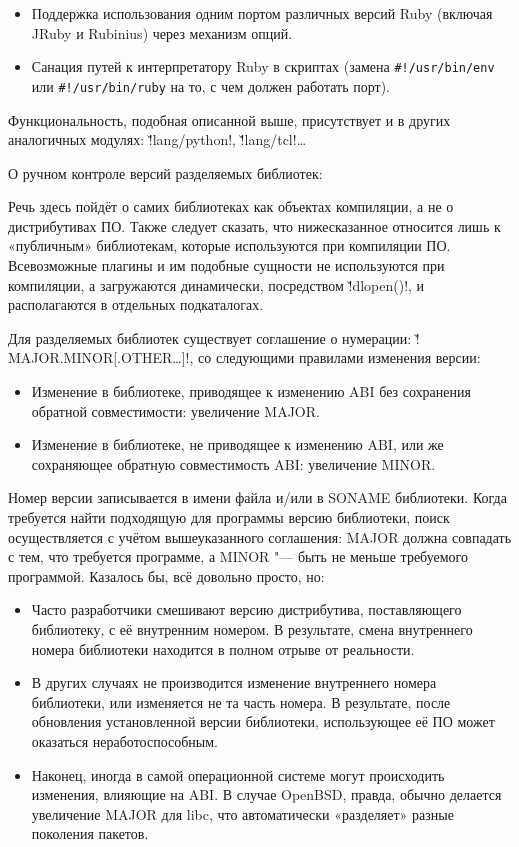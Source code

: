 \documentclass[10pt, a5paper]{article}
\begin{document}
\begin{itemize}
  \item Поддержка использования одним портом различных версий Ruby (включая JRuby и Rubinius) через механизм опций.
  \item Санация путей к интерпретатору Ruby в скриптах (замена \texttt{\#!/usr/bin/env} или \texttt{\#!/usr/bin/ruby} на то, с чем должен работать порт).
\end{itemize}

Функциональность, подобная описанной выше, присутствует и в других аналогичных модулях: \v!lang/python!, \v!lang/tcl!\ldots{}

О ручном контроле версий разделяемых библиотек:

Речь здесь пойдёт о самих библиотеках как объектах компиляции, а не о дистрибутивах ПО. Также следует сказать, что нижесказанное относится лишь к «публичным» библиотекам, которые используются при компиляции ПО. Всевозможные плагины и им подобные сущности не используются при компиляции, а загружаются динамически, посредством \v!dlopen()!, и располагаются в отдельных подкаталогах.

Для разделяемых библиотек существует соглашение о нумерации: \v!MAJOR.MINOR[.OTHER\ldots{}]!, со следующими правилами изменения версии:

\begin{itemize}
  \item Изменение в библиотеке, приводящее к изменению ABI без сохранения обратной совместимости: увеличение MAJOR.
  \item Изменение в библиотеке, не приводящее к изменению ABI, или же сохраняющее обратную совместимость ABI: увеличение MINOR.
\end{itemize}

Номер версии записывается в имени файла и/или в SONAME библиотеки. Когда требуется найти подходящую для программы версию библиотеки, поиск осуществляется с учётом вышеуказанного соглашения: MAJOR должна совпадать с тем, что требуется программе, а MINOR "--- быть не меньше требуемого программой. Казалось бы, всё довольно просто, но:

\begin{itemize}
  \item Часто разработчики смешивают версию дистрибутива, поставляющего библиотеку, с её внутренним номером. В результате, смена внутреннего номера библиотеки находится в полном отрыве от реальности.
  \item В других случаях не производится изменение внутреннего номера библиотеки, или изменяется не та часть номера. В результате, после обновления установленной версии библиотеки, использующее её ПО может оказаться неработоспособным.
  \item Наконец, иногда в самой операционной системе могут происходить изменения, влияющие на ABI. В случае OpenBSD, правда, обычно делается увеличение MAJOR для libc, что автоматически «разделяет» разные поколения пакетов.
\end{itemize}
\end{document}
